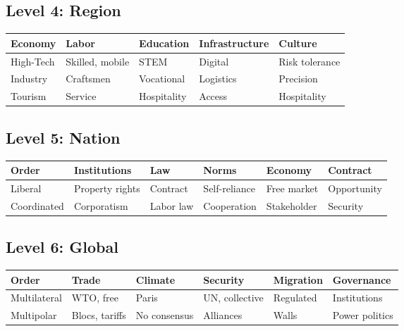 \documentclass[12pt,a4paper]{article}
\begin{document}
\subsection{Level 4: Region}

\begin{center}
\renewcommand{\arraystretch}{1.1}
\begin{tabular}{lllll}
\hline
\textbf{Economy} & \textbf{Labor} & \textbf{Education} & \textbf{Infrastructure} & \textbf{Culture} \\
\hline
High-Tech & Skilled, mobile & STEM & Digital & Risk tolerance \\
Industry & Craftsmen & Vocational & Logistics & Precision \\
Tourism & Service & Hospitality & Access & Hospitality \\
\hline
\end{tabular}
\end{center}

\subsection{Level 5: Nation}

\begin{center}
\renewcommand{\arraystretch}{1.1}
\begin{tabular}{llllll}
\hline
\textbf{Order} & \textbf{Institutions} & \textbf{Law} & \textbf{Norms} & \textbf{Economy} & \textbf{Contract} \\
\hline
Liberal & Property rights & Contract & Self-reliance & Free market & Opportunity \\
Coordinated & Corporatism & Labor law & Cooperation & Stakeholder & Security \\
\hline
\end{tabular}
\end{center}

\subsection{Level 6: Global}

\begin{center}
\renewcommand{\arraystretch}{1.1}
\begin{tabular}{llllll}
\hline
\textbf{Order} & \textbf{Trade} & \textbf{Climate} & \textbf{Security} & \textbf{Migration} & \textbf{Governance} \\
\hline
Multilateral & WTO, free & Paris & UN, collective & Regulated & Institutions \\
Multipolar & Blocs, tariffs & No consensus & Alliances & Walls & Power politics \\
\hline
\end{tabular}
\end{center}
\end{document}
